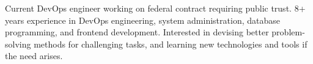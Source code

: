 

\begin{cvparagraph}

Current DevOps engineer working on federal contract requiring public trust.  8+ years experience in DevOps engineering, system administration, database programming, and frontend development. Interested in devising better problem-solving methods for challenging tasks, and learning new technologies and tools if the need arises.
\end{cvparagraph}
